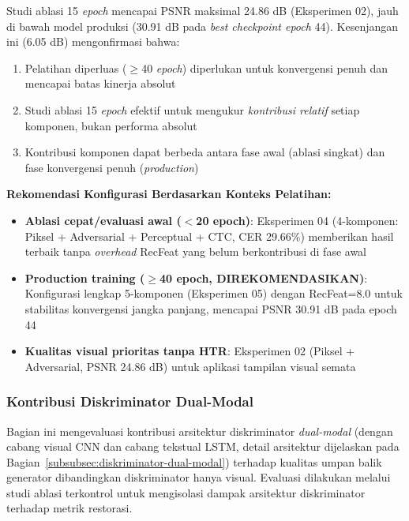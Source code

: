 \documentclass[12pt,a4paper]{article}
\begin{document}
Studi ablasi 15 \textit{epoch} mencapai PSNR maksimal 24.86 dB (Eksperimen 02), jauh di bawah model produksi (30.91 dB pada \textit{best checkpoint epoch} 44). Kesenjangan ini (6.05 dB) mengonfirmasi bahwa:
\begin{enumerate}[nosep]
    \item Pelatihan diperluas ($\geq$40 \textit{epoch}) diperlukan untuk konvergensi penuh dan mencapai batas kinerja absolut
    \item Studi ablasi 15 \textit{epoch} efektif untuk mengukur \textit{kontribusi relatif} setiap komponen, bukan performa absolut
    \item Kontribusi komponen dapat berbeda antara fase awal (ablasi singkat) dan fase konvergensi penuh (\textit{production})
\end{enumerate}

\textbf{Rekomendasi Konfigurasi Berdasarkan Konteks Pelatihan:}
\begin{itemize}[nosep]
    \item \textbf{Ablasi cepat/evaluasi awal ($<$20 epoch)}: Eksperimen 04 (4-komponen: Piksel + Adversarial + Perceptual + CTC, CER 29.66\%) memberikan hasil terbaik tanpa \textit{overhead} RecFeat yang belum berkontribusi di fase awal
    \item \textbf{Production training ($\geq$40 epoch, DIREKOMENDASIKAN)}: Konfigurasi lengkap 5-komponen (Eksperimen 05) dengan RecFeat=8.0 untuk stabilitas konvergensi jangka panjang, mencapai PSNR 30.91 dB pada epoch 44
    \item \textbf{Kualitas visual prioritas tanpa HTR}: Eksperimen 02 (Piksel + Adversarial, PSNR 24.86 dB) untuk aplikasi tampilan visual semata
\end{itemize}

\vspace{0.8em}

\subsubsection{Kontribusi Diskriminator Dual-Modal}
\label{subsubsec:kontribusi-dual-modal}

Bagian ini mengevaluasi kontribusi arsitektur diskriminator \textit{dual-modal} (dengan cabang visual CNN dan cabang tekstual LSTM, detail arsitektur dijelaskan pada Bagian~\ref{subsubsec:diskriminator-dual-modal}) terhadap kualitas umpan balik generator dibandingkan diskriminator hanya visual. Evaluasi dilakukan melalui studi ablasi terkontrol untuk mengisolasi dampak arsitektur diskriminator terhadap metrik restorasi.
\end{document}
